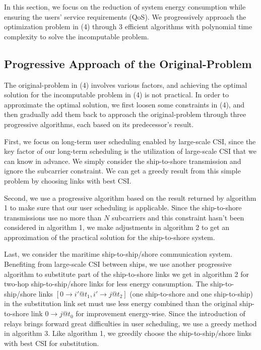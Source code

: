 \documentclass[conference]{IEEEtran}
\begin{document}
In this section, we focus on the reduction of system energy consumption while ensuring the users' service requirements (QoS). We progressively approach the optimization problem in (4) through 3 efficient algorithms with polynomial time complexity to solve the incomputable problem.


\subsection{Progressive Approach of the Original-Problem}

The original-problem in (4) involves various factors, and achieving the optimal solution for the incomputable problem in (4) is not practical. 
In order to approximate the optimal solution, we first loosen some constraints in (4), and then gradually add them back to approach the original-problem through three progressive algorithms, each based on its predecessor's result. 

First, we focus on long-term user scheduling enabled by large-scale CSI, since the key factor of our long-term scheduling is the utilization of large-scale CSI that we can know in advance. We simply consider the ship-to-shore transmission and ignore the subcarrier constraint. We can get a greedy result from this simple problem by choosing links with best CSI. 

Second, we use a progressive algorithm based on the result returned by algorithm 1 to make sure that our user scheduling is applicable. Since the ship-to-shore transmissions use no more than $N$ subcarriers and this constraint hasn't been considered in algorithm 1, we make adjustments in algorithm 2 to get an approximation of the practical solution for the ship-to-shore system. 

Last, we consider the maritime ship-to-ship/shore communication system. Benefiting from large-scale CSI between ships, we use another progressive algorithm to substitute part of the ship-to-shore links we get in algorithm 2 for two-hop ship-to-ship/shore links for less energy consumption. The ship-to-ship/shore links $\left[ {0 \to i'@{t_1},i' \to j@{t_2}} \right]$ (one ship-to-shore and one ship-to-ship) in the substitution link set must use less energy combined than the original ship-to-shore link $0 \to j@{t_0}$ for improvement energy-wise. Since the introduction of relays brings forward great difficulties in user scheduling, we use a greedy method in algorithm 3. Like algorithm 1, we greedily choose the ship-to-ship/shore links with best CSI for substitution. 
\end{document}
